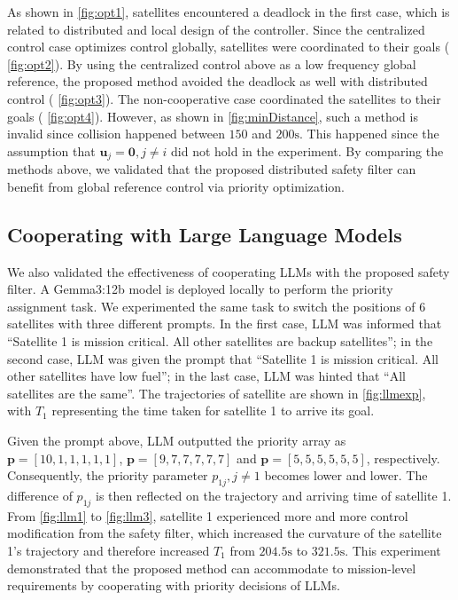 \documentclass{ifacconf}
\begin{document}
\par As shown in {\figurename} \ref{fig:opt1}, satellites encountered a deadlock in the first case, which is related to distributed and local design of the controller.
Since the centralized control case optimizes control globally, satellites were coordinated to their goals ({\figurename} \ref{fig:opt2}).
By using the centralized control above as a low frequency global reference, the proposed method avoided the deadlock as well with distributed control ({\figurename} \ref{fig:opt3}).
The non-cooperative case coordinated the satellites to their goals ({\figurename} \ref{fig:opt4}). 
However, as shown in {\figurename} \ref{fig:minDistance}, such a method is invalid since collision happened between $150$ and $200\mathrm{s}$.
This happened since the assumption that $\boldsymbol{u}_j = \boldsymbol{0}, j \neq i$ did not hold in the experiment.
By comparing the methods above, we validated that the proposed distributed safety filter can benefit from global reference control via priority optimization.

\subsection{Cooperating with Large Language Models}
\par We also validated the effectiveness of cooperating LLMs with the proposed safety filter. A Gemma3:12b \cite[]{XXX} model is deployed locally to perform the priority assignment task. We experimented the same task to switch the positions of 6 satellites with three different prompts. 
In the first case, LLM was informed that ``Satellite 1 is mission critical. All other satellites are backup satellites''; 
in the second case, LLM was given the prompt that ``Satellite 1 is mission critical. All other satellites have low fuel'';
in the last case, LLM was hinted that ``All satellites are the same''.
The trajectories of satellite are shown in {\figurename} \ref{fig:llmexp}, with $T_1$ representing the time taken for satellite 1 to arrive its goal.

\par Given the prompt above, LLM outputted the priority array as $\mathbf{p} = [10, 1, 1, 1, 1, 1]$, $\mathbf{p} = [9, 7, 7, 7, 7, 7]$ and $\mathbf{p} = [5, 5, 5, 5, 5, 5]$, respectively. 
Consequently, the priority parameter $p_{1j}, j\neq 1$ becomes lower and lower.
The difference of $p_{1j}$ is then reflected on the trajectory and arriving time  of satellite 1. 
From {\figurename} \ref{fig:llm1} to {\figurename} \ref{fig:llm3}, satellite 1 experienced more and more control modification from the safety filter, which increased the curvature of the satellite 1's trajectory and therefore increased $T_1$ from $204.5\mathrm{s}$ to $321.5\mathrm{s}$.
This experiment demonstrated that the proposed method can accommodate to mission-level requirements by cooperating with priority decisions of LLMs.
\end{document}
